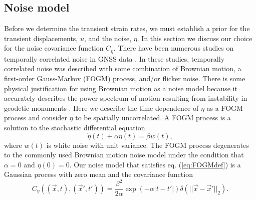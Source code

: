\documentclass[10pt,letter]{article}
\begin{document}
\subsection{Noise model}\label{sec:NoiseModel}
Before we determine the transient strain rates, we must establish a prior for the transient displacements, $u$, and the noise, $\eta$. In this section we discuss our choice for the noise covariance function $C_\eta$. There have been numerous studies on temporally correlated noise in GNSS data \citep[e.g.,][]{Zhang1997,Mao1999,Williams2004,Langbein2008}. In these studies, temporally correlated noise was described with some combination of Brownian motion, a first-order Gauss-Markov (FOGM) process, and/or flicker noise. There is some physical justification for using Brownian motion as a noise model because it accurately describes the power spectrum of motion resulting from instability in geodetic monuments \citep[e.g.,][]{Wyatt1982,Wyatt1989}. Here we describe the time dependence of $\eta$ as a FOGM process and consider $\eta$ to be spatially uncorrelated. A FOGM process is a solution to the stochastic differential equation
\begin{equation}\label{eq:FOGMdef}
\dot{\eta}(t) + \alpha \eta(t) = \beta w(t),
\end{equation}
where $w(t)$ is white noise with unit variance. The FOGM process degenerates to the commonly used Brownian motion noise model under the condition that $\alpha=0$ and $\eta(0) = 0$. Our noise model that satisfies eq. (\ref{eq:FOGMdef}) is a Gaussian process with zero mean and the covariance function
\begin{equation}\label{eq:FOGM}
C_\eta\left((\vec{x},t),(\vec{x}',t')\right) = \frac{\beta^2}{2\alpha}\exp\left(-\alpha|t - t'|\right) \delta(||\vec{x} - \vec{x}'||_2). 
\end{equation}
\end{document}
